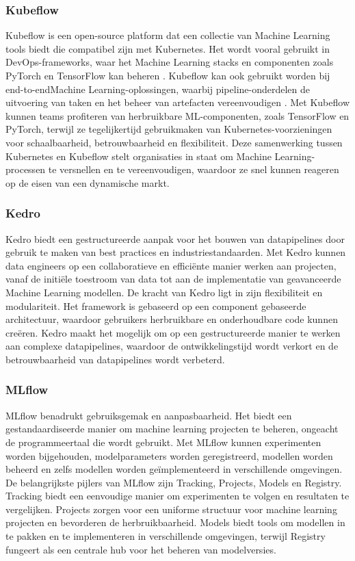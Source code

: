 \subsubsection{Kubeflow}
Kubeflow \autocite{Kubeflow2021} is een open-source platform dat een collectie van Machine Learning tools biedt die compatibel zijn met Kubernetes. Het wordt vooral gebruikt in DevOps-frameworks, waar het Machine Learning stacks en componenten zoals PyTorch en TensorFlow kan beheren \autocite{Chandana2021}.\newline
Kubeflow kan ook gebruikt worden bij end-to-end\newline Machine Learning-oplossingen, waarbij pipeline-onderdelen de uitvoering van taken en het beheer van artefacten vereenvoudigen \autocite{Bisong2019}.
Met Kubeflow kunnen teams profiteren van herbruikbare ML-componenten, zoals TensorFlow en PyTorch, terwijl ze tegelijkertijd gebruikmaken van Kubernetes-voorzieningen voor schaalbaarheid, betrouwbaarheid en flexibiliteit. Deze samenwerking tussen Kubernetes en Kubeflow stelt organisaties in staat om Machine Learning-processen te versnellen en te vereenvoudigen, waardoor ze snel kunnen reageren op de eisen van een dynamische markt.
\subsubsection{Kedro}
Kedro \autocite{Kedro2024} biedt een gestructureerde aanpak voor het bouwen van datapipelines door gebruik te maken van best practices en industriestandaarden. Met Kedro kunnen data engineers op een collaboratieve en efficiënte manier werken aan projecten, vanaf de initiële toestroom van data tot aan de implementatie van geavanceerde Machine Learning modellen.
De kracht van Kedro ligt in zijn flexibiliteit en modulariteit. Het framework is gebaseerd op een component gebaseerde architectuur, waardoor gebruikers herbruikbare en onderhoudbare code kunnen creëren. Kedro maakt het mogelijk om op een gestructureerde manier te werken aan complexe datapipelines, waardoor de ontwikkelingstijd wordt verkort en de betrouwbaarheid van datapipelines wordt verbeterd.
\subsubsection{MLflow}
MLflow benadrukt gebruiksgemak en aanpasbaarheid. Het biedt een gestandaardiseerde manier om machine learning projecten te beheren, ongeacht de programmeertaal die wordt gebruikt. Met MLflow kunnen experimenten worden bijgehouden, modelparameters worden geregistreerd, modellen worden beheerd en zelfs modellen worden geïmplementeerd in verschillende omgevingen.
De belangrijkste pijlers van MLflow zijn Tracking, Projects, Models en Registry. Tracking biedt een eenvoudige manier om experimenten te volgen en resultaten te vergelijken. Projects zorgen voor een uniforme structuur voor machine learning projecten en bevorderen de herbruikbaarheid. Models biedt tools om modellen in te pakken en te implementeren in verschillende omgevingen, terwijl Registry fungeert als een centrale hub voor het beheren van modelversies.

